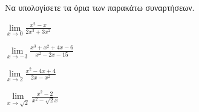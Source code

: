 Να υπολογίσετε τα όρια των παρακάτω συναρτήσεων.
\begin{multicols}{2}
\begin{alist}
\item $ \lim\limits_{x\to 0}\frac{x^2-x}{2x^3+3x^2} $
\item $ \lim\limits_{x\to -3}\frac{x^3+x^2+4x-6}{x^2-2x-15} $
\item $ \lim\limits_{x\to2}\frac{x^2-4x+4}{2x-x^2} $
\item $ \lim\limits_{x\to \sqrt{2}}{\frac{x^2-2}{x^2-\sqrt{2}x}} $
\end{alist}
\end{multicols}
